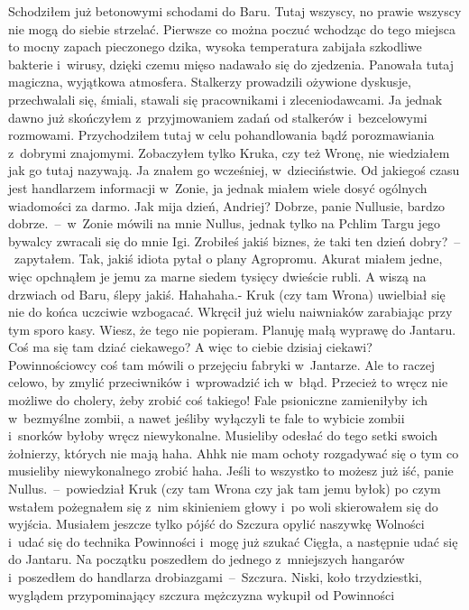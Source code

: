\documentclass[../MAIN.tex]{subfiles}
\begin{document}
Schodziłem już betonowymi schodami do Baru. Tutaj wszyscy, no
prawie wszyscy nie mogą do siebie strzelać. Pierwsze co można
poczuć wchodząc do tego miejsca to mocny zapach pieczonego
dzika, wysoka temperatura zabijała szkodliwe bakterie i~wirusy,
dzięki czemu mięso nadawało się do zjedzenia. Panowała tutaj
magiczna, wyjątkowa atmosfera. Stalkerzy prowadzili ożywione
dyskusje, przechwalali się, śmiali, stawali się pracownikami i
zleceniodawcami. Ja jednak dawno już skończyłem z~przyjmowaniem
zadań od stalkerów i~bezcelowymi rozmowami. Przychodziłem tutaj
w celu pohandlowania bądź porozmawiania z~dobrymi znajomymi.
Zobaczyłem tylko Kruka, czy też Wronę, nie wiedziałem jak go
tutaj nazywają. Ja znałem go wcześniej, w~dzieciństwie. Od
jakiegoś czasu jest handlarzem informacji w~Zonie, ja jednak
miałem wiele dosyć ogólnych wiadomości za darmo.
\sd
\xx Jak mija dzień, Andriej?
\xx Dobrze, panie Nullusie, bardzo dobrze.~--~w~Zonie mówili na
mnie Nullus, jednak tylko na Pchlim Targu jego bywalcy zwracali
się do mnie Igi.
\xx Zrobiłeś jakiś biznes, że taki ten dzień
dobry?~--~zapytałem.
\xx Tak, jakiś idiota pytał o plany Agropromu. Akurat miałem
jedne, więc opchnąłem je jemu za marne siedem tysięcy dwieście
rubli. A wiszą na drzwiach od Baru, ślepy jakiś. Hahahaha.-
Kruk (czy tam Wrona) uwielbiał się nie do końca uczciwie
wzbogacać. Wkręcił już wielu naiwniaków zarabiając przy tym
sporo kasy.
\xx Wiesz, że tego nie popieram. Planuję małą wyprawę do
Jantaru.
Coś ma się tam dziać ciekawego?
\xx A więc to ciebie dzisiaj ciekawi? Powinnościowcy coś tam
mówili o przejęciu fabryki w~Jantarze. Ale to raczej celowo, by
zmylić przeciwników i~wprowadzić ich w~błąd. Przecież to wręcz
nie możliwe do cholery, żeby zrobić coś takiego! Fale
psioniczne zamieniłyby ich w~bezmyślne zombii, a nawet jeśliby
wyłączyli te fale to wybicie zombii i~snorków byłoby wręcz
niewykonalne. Musieliby odesłać do tego setki swoich żołnierzy,
których nie mają haha. Ahh\3k nie mam ochoty rozgadywać się o
tym
co musieliby niewykonalnego zrobić haha. Jeśli to wszystko to
możesz już iść, panie Nullus.~--~powiedział Kruk (czy tam Wrona
czy jak tam jemu było\3k) po czym wstałem pożegnałem się z~nim
skinieniem głowy i~po woli skierowałem się do wyjścia.
\qd
Musiałem jeszcze tylko pójść do Szczura opylić naszywkę
Wolności i~udać się do technika Powinności i~mogę już szukać
Cięgła, a następnie udać się do Jantaru. Na początku poszedłem
do jednego z~mniejszych hangarów i~poszedłem do handlarza
drobiazgami~--~Szczura. Niski, koło trzydziestki, wyglądem
przypominający szczura mężczyzna wykupił od Powinności
\end{document}
